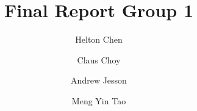 \documentclass[conference]{IEEEtran}
\begin{document}
%
\title{Final Report Group 1}



\author{Helton Chen \and Claus Choy \and Andrew Jesson \and Meng Yin Tao}


% 
\end{document}
